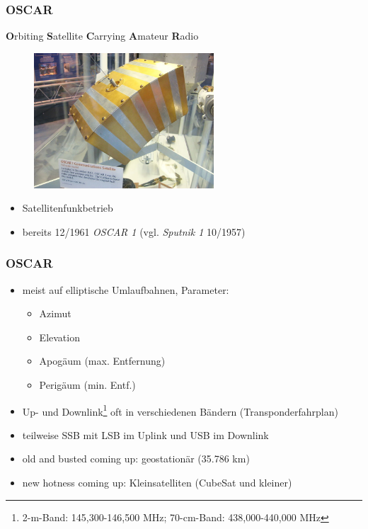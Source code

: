 \begin{frame}
  \frametitle{OSCAR}


  \textbf{O}rbiting \textbf{S}atellite \textbf{C}arrying \textbf{A}mateur \textbf{R}adio

  \begin{center}
    \begin{figure}
      \includegraphics[width=0.6\textwidth,height=.5\textheight,keepaspectratio]{bv11/OSCAR1.jpg}
    \end{figure}
  \end{center}

  \begin{itemize}
    \item Satellitenfunkbetrieb
    \item bereits 12/1961 \emph{OSCAR 1} (vgl. \emph{Sputnik 1} 10/1957)
  \end{itemize}

\end{frame}

\begin{frame}
  \frametitle{OSCAR}

  \begin{itemize}
    \item meist auf elliptische Umlaufbahnen, Parameter:
      \begin{itemize}
        \item Azimut
        \item Elevation
        \item Apogäum (max. Entfernung)
        \item Perigäum (min. Entf.)
      \end{itemize}
    \item Up- und Downlink\footnote{2-m-Band: 145,300-146,500 MHz; 70-cm-Band: 438,000-440,000 MHz}
      oft in verschiedenen Bändern (Transponderfahrplan)
    \item teilweise SSB mit LSB im Uplink und USB im Downlink
    \item old and busted coming up: geostationär (35.786 km)
    \item new hotness coming up: Kleinsatelliten (CubeSat und kleiner)
  \end{itemize}

\end{frame}

